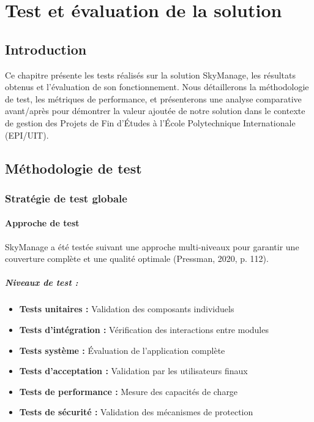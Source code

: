 \chapter{Test et évaluation de la solution}

\section{Introduction}

Ce chapitre présente les tests réalisés sur la solution SkyManage, les résultats obtenus et l'évaluation de son fonctionnement. Nous détaillerons la méthodologie de test, les métriques de performance, et présenterons une analyse comparative avant/après pour démontrer la valeur ajoutée de notre solution dans le contexte de gestion des Projets de Fin d'Études à l'École Polytechnique Internationale (EPI/UIT).

\section{Méthodologie de test}

\subsection{Stratégie de test globale}

\subsubsection{Approche de test}
SkyManage a été testée suivant une approche multi-niveaux pour garantir une couverture complète et une qualité optimale (Pressman, 2020, p. 112).

\paragraph{Niveaux de test :}
\begin{itemize}
    \item \textbf{Tests unitaires :} Validation des composants individuels
    \item \textbf{Tests d'intégration :} Vérification des interactions entre modules
    \item \textbf{Tests système :} Évaluation de l'application complète
    \item \textbf{Tests d'acceptation :} Validation par les utilisateurs finaux
    \item \textbf{Tests de performance :} Mesure des capacités de charge
    \item \textbf{Tests de sécurité :} Validation des mécanismes de protection
\end{itemize}

